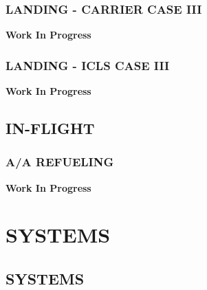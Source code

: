 \documentclass[fontInter]{TechCheck}
\begin{document}
	\vfill\null
	\clearpage


	\subsection{LANDING - CARRIER CASE III}
	\begin{center}
	\end{center}

	\begin{center}
		\large \textbf{Work In Progress} \normalsize
	\end{center}

	\subsection{LANDING - ICLS CASE III}
	\begin{center}
		\large \textbf{Work In Progress} \normalsize
	\end{center}

	\section{IN-FLIGHT}

	\subsection{A/A REFUELING}
	\begin{center}
		\large \textbf{Work In Progress} \normalsize
	\end{center}

	\cleardoublepage

	\chapter{SYSTEMS}
	\minitoc
	\cleardoublepage

	\section{SYSTEMS}
\end{document}
